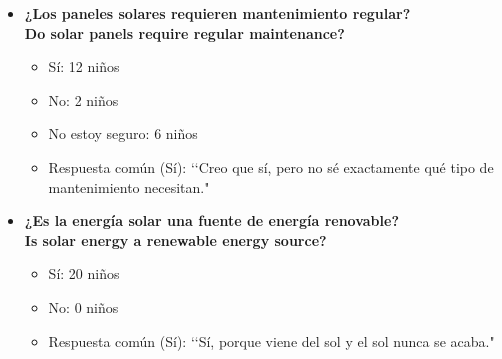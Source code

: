 \documentclass[12pt]{article}
\begin{document}
\begin{itemize}
      \item \textbf{¿Los paneles solares requieren mantenimiento regular?}\\
            \textbf{Do solar panels require regular maintenance?}
            \begin{itemize}
                  \item Sí: 12 niños
                  \item No: 2 niños
                  \item No estoy seguro: 6 niños
                  \item Respuesta común (Sí): \lq\lq Creo que sí, pero no sé exactamente qué tipo de mantenimiento necesitan."
            \end{itemize}
            \begin{minipage}{\linewidth}
                  \centering
                  \begin{minipage}{0.5\linewidth}
                  \end{minipage}%
            \end{minipage}

      \item \textbf{¿Es la energía solar una fuente de energía renovable?}\\
            \textbf{Is solar energy a renewable energy source?}
            \begin{itemize}
                  \item Sí: 20 niños
                  \item No: 0 niños
                  \item Respuesta común (Sí): \lq\lq Sí, porque viene del sol y el sol nunca se acaba."
            \end{itemize}
            \begin{minipage}{\linewidth}
                  \centering
                  \begin{minipage}{0.5\linewidth}
                  \end{minipage}%
            \end{minipage}


\end{itemize}
\end{document}
